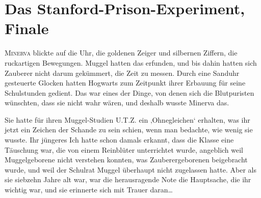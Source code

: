 \chapter{Das Stanford-Prison-Experiment, Finale}

\lettrine{M}{inerva} blickte auf die Uhr, die goldenen Zeiger und silbernen Ziffern, die ruckartigen Bewegungen. Muggel hatten das erfunden, und bis dahin hatten sich Zauberer nicht darum gekümmert, die Zeit zu messen. Durch eine Sanduhr gesteuerte Glocken hatten Hogwarts zum Zeitpunkt ihrer Erbauung für seine Schulstunden gedient. Das war eines der Dinge, von denen sich die Blutpuristen wünschten, dass sie nicht wahr wären, und deshalb wusste Minerva das.

Sie hatte für ihren Muggel-Studien U.T.Z. ein ‚Ohnegleichen‘ erhalten, was ihr jetzt ein Zeichen der Schande zu sein schien, wenn man bedachte, wie wenig sie wusste.%
Ihr jüngeres Ich hatte schon damals erkannt, dass die Klasse eine Täuschung war, die von einem Reinblüter unterrichtet wurde, angeblich weil Muggelgeborene nicht verstehen konnten, was Zauberergeborenen beigebracht wurde, und weil der Schulrat Muggel überhaupt nicht zugelassen hatte. Aber als sie siebzehn Jahre alt war, war die herausragende Note die Hauptsache, die ihr wichtig war, und sie erinnerte sich mit Trauer daran…

